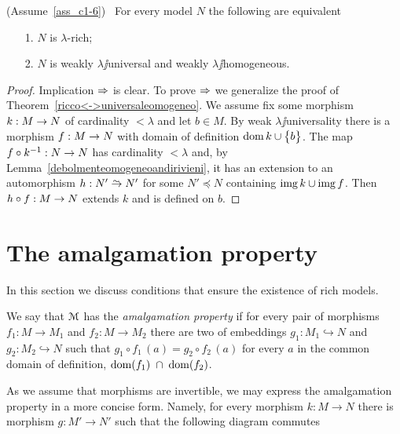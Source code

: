\documentclass[creche.tex]{subfiles}
\begin{document}
\begin{theorem}\label{ricco=universaledebolmenteomogeneo}
(Assume~\ref{ass_c1-6})  \  For every model $N$ the following are equivalent
\begin{itemize}
\item[1.] $N$ is $\lambda$-rich;
\item[2.] $N$ is  weakly $\lambda\jj$universal and weakly $\lambda\jj$homogeneous.
\end{itemize}
\end{theorem}

\begin{proof} 
Implication $\Rightarrow$ is clear.
To prove $\Rightarrow$ we generalize the proof of Theorem~\ref{ricco<->universaleomogeneo}.
We assume  fix some morphism $k:M\rightarrow N$ of cardinality $<\lambda$ and let $b\in M$.
By weak $\lambda\jj$universality there is a morphism $f:M\rightarrow N$ with domain of definition $\mathop{\rm dom} k\cup\big\{b\big\}$.
The map $f\circ k^{-1}:N\rightarrow N$ has cardinality $<\lambda$ and, by Lemma~\ref{debolmenteomogeneoandirivieni}, it has an extension to an automorphism $h:N'\isomap N'$ for some $N'\preceq N$ containing $\mathop{\rm img} k\cup\mathop{\rm img} f$.
Then $h\circ f:M\rightarrow N$ extends $k$ and is defined on $b$.
\end{proof}

\section{The amalgamation property}

In this section we discuss conditions that ensure the existence of rich models.

We say that $\EuScript M$ has the \emph{amalgamation property\/} if for every pair of morphisms $f_1:M\to M_1$ and $f_2:M\to M_2$ there are two of embeddings $g_1:M_1\hookrightarrow N$ and $g_2:M_2\hookrightarrow N$ such that $g_1\circ f_1\, (a) = g_2\circ f_2\, (a)$ for every $a$ in the common domain of definition, $\mathop{\rm dom} (f_1)\; \cap\; \mathop{\rm dom} (f_2)$.


\hfil{}

As we assume that morphisms are invertible, we may express the amalgamation property in a more concise form.
Namely, for every morphism $k:M\to N$ there is morphism  $g:M'\to N'$ such that the following diagram commutes
\end{document}
